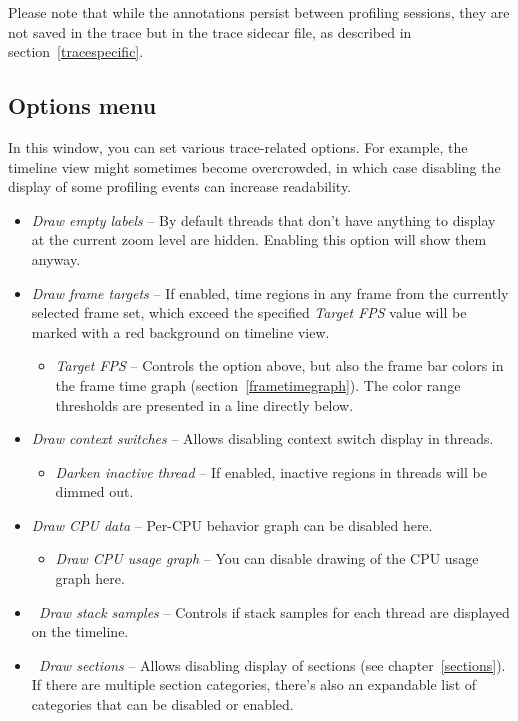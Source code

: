 \documentclass[hidelinks,titlepage,a4paper,twoside]{article}
\begin{document}
Please note that while the annotations persist between profiling sessions, they are not saved in the trace but in the trace sidecar file, as described in section~\ref{tracespecific}.

\subsection{Options menu}
\label{options}

In this window, you can set various trace-related options. For example, the timeline view might sometimes become overcrowded, in which case disabling the display of some profiling events can increase readability.

\begin{itemize}
\item \emph{\faExpand{} Draw empty labels} -- By default threads that don't have anything to display at the current zoom level are hidden. Enabling this option will show them anyway.
\item \emph{\faFlagCheckered{} Draw frame targets} -- If enabled, time regions in any frame from the currently selected frame set, which exceed the specified \emph{Target FPS} value will be marked with a red background on timeline view.
\begin{itemize}
\item \emph{Target FPS} -- Controls the option above, but also the frame bar colors in the frame time graph (section~\ref{frametimegraph}). The color range thresholds are presented in a line directly below.
\end{itemize}
\item \emph{\faPersonHiking{} Draw context switches} -- Allows disabling context switch display in threads.
\begin{itemize}
\item \emph{\faMoon{} Darken inactive thread} -- If enabled, inactive regions in threads will be dimmed out.
\end{itemize}
\item \emph{\faSliders{} Draw CPU data} -- Per-CPU behavior graph can be disabled here.
\begin{itemize}
\item \emph{\faSignature{} Draw CPU usage graph} -- You can disable drawing of the CPU usage graph here.
\end{itemize}
\item \emph{\faEyeDropper{}~Draw stack samples} -- Controls if stack samples for each thread are displayed on the timeline.
\item \emph{\faArrowsLeftRightToLine{}~Draw sections} -- Allows disabling display of sections (see chapter~\ref{sections}). If there are multiple section categories, there's also an expandable list of categories that can be disabled or enabled.

\end{itemize}
\end{document}
